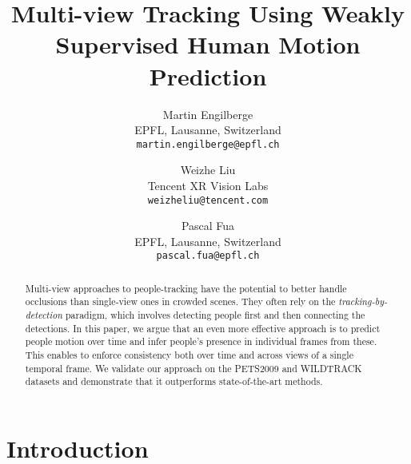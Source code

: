 \documentclass[10pt,twocolumn,letterpaper]{article}
\begin{document}
\def\cL{\mcl{L}}

\def\ie{\emph{i.e.}}
\def\eg{\emph{e.g.}}
\def\iid{\emph{i.i.d.}}
\def\wrt{w.r.t.}
\def\mwrt{\mrm{w.r.t.}}
\def\msbt{\mrm{sb.t.}}

\def\sqt{^{\frac{1}{2}}} \def\msqt{^{-\frac{1}{2}}} \def\R{\mbb R}
\def\vtheta{\mbs{\theta}}




 


\title{Multi-view Tracking Using Weakly Supervised Human Motion Prediction}

\author{Martin Engilberge\\
EPFL, Lausanne, Switzerland \\
{\tt\small martin.engilberge@epfl.ch}
\and
Weizhe Liu\\
Tencent XR Vision Labs \\
{\tt\small weizheliu@tencent.com}
\and
Pascal Fua\\
EPFL, Lausanne, Switzerland \\
{\tt\small pascal.fua@epfl.ch}
}

\maketitle
\thispagestyle{empty}



\begin{abstract}
   

Multi-view approaches to people-tracking have the potential to better handle occlusions than single-view ones in crowded scenes. They often rely on the \textit{tracking-by-detection} paradigm, which involves detecting people first and then connecting the detections. In this paper, we argue that an even more effective approach is to predict people motion over time and infer people's presence in individual frames from these. This enables to enforce consistency both over time and across views of a single temporal frame. We validate our approach on the PETS2009 and WILDTRACK datasets and demonstrate that it outperforms state-of-the-art methods.








 \end{abstract}


\section{Introduction}\label{sec:intro}
 
\end{document}
